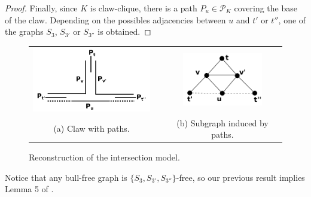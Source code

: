\documentclass{dmgt}
\begin{document}
\begin{proof}
 Finally,   since $K$ is claw-clique,  there is a path $P_u \in \mathcal{P}_K$ covering the base of the claw. Depending on the 
 possibles adjacencies between  $u$ and $t'$ or  $t''$, one of the graphs  $S_{3}$, $S_{3'}$ or $S_{3''}$ is obtained.

\end{proof}

%
\begin{figure}
  \centering
  \begin{tabular}{  c p{0.7cm} c}
    \includegraphics[width=5.5cm]{clawGrid} & &
    \includegraphics[width=3.5cm]{clawInduced.png}
    \\
    \footnotesize %
    (a)  \footnotesize Claw with paths. && \footnotesize (b) Subgraph induced by paths.\\
  \end{tabular}

 \caption{Reconstruction of the intersection model.}
 \label{fig:clawGrid}
\end{figure} 

Notice that any bull-free graph is $\{S_{3}, S_{3'}, S_{3''}\}$-free, so our previous result implies  Lemma 5 of  \cite{ries2009}.
\end{document}
